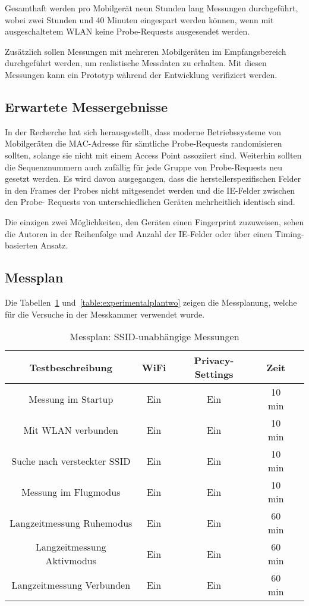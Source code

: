 Gesamthaft werden pro Mobilgerät neun Stunden lang Messungen durchgeführt, 
wobei zwei Stunden und 40 Minuten eingespart werden können, wenn mit 
ausgeschaltetem WLAN keine Probe-Requests ausgesendet werden.

Zusätzlich sollen Messungen mit mehreren Mobilgeräten im Empfangsbereich
durchgeführt werden, um realistische Messdaten zu erhalten. 
Mit diesen Messungen kann ein  Prototyp während der Entwicklung verifiziert 
werden.  

\clearpage

\subsection{Erwartete Messergebnisse}
In der Recherche hat sich herausgestellt, dass moderne Betriebssysteme von 
Mobilgeräten die MAC-Adresse für sämtliche Probe-Requests randomisieren sollten, 
solange sie nicht mit einem Access Point assoziiert sind. 
Weiterhin sollten die Sequenznummern auch zufällig für jede Gruppe von 
Probe-Requests neu gesetzt werden.
Es wird davon ausgegangen, dass die herstellerspezifischen Felder in den Frames
der Probes nicht mitgesendet werden und die IE-Felder zwischen den Probe-
Requests von unterschiedlichen Geräten mehrheitlich identisch sind.

Die einzigen zwei Möglichkeiten, den Geräten einen Fingerprint zuzuweisen,
sehen die Autoren in der Reihenfolge und Anzahl der IE-Felder oder über einen 
Timing-basierten Ansatz.

\subsection{Messplan}
Die Tabellen~\ref{table:experimentalplanone} und~\ref{table:experimentalplantwo} 
zeigen die Messplanung, welche für die Versuche in der Messkammer verwendet 
wurde.

\begin{table}[h!]
	\centering
	\begin{tabular}{|c|c|c|c|c|}
		\hline
        \textbf{Testbeschreibung} & \textbf{WiFi} & \textbf{Privacy-Settings} & \textbf{Zeit}  \\
        \hline
        Messung im Startup & Ein & Ein & 10 min  \\
        Mit WLAN verbunden & Ein & Ein & 10 min  \\
        Suche nach versteckter SSID & Ein & Ein & 10 min \\
        Messung im Flugmodus & Ein & Ein & 10 min \\
        \hline
        Langzeitmessung Ruhemodus & Ein & Ein & 60 min \\
        Langzeitmessung Aktivmodus & Ein & Ein & 60 min \\
        Langzeitmessung Verbunden & Ein & Ein & 60 min \\
        \hline
    \end{tabular}
    \caption{Messplan: SSID-unabhängige Messungen
    \label{table:experimentalplanone}}  
\end{table}

